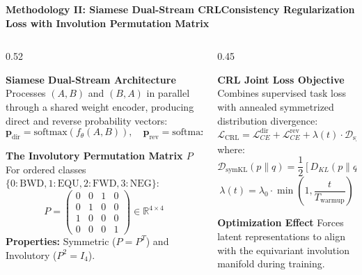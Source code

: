 \documentclass[aspectratio=169,10pt]{beamer}
\begin{document}
\begin{frame}{\textbf{Methodology II: Siamese Dual-Stream CRL}}{\textbf{Consistency Regularization Loss with Involution Permutation Matrix}}
  \begin{columns}[T]
    \begin{column}{0.52\textwidth}
      \begin{block}{\textbf{Siamese Dual-Stream Architecture}}
        \small
        Processes $(A, B)$ and $(B, A)$ in parallel through a shared weight encoder, producing direct and reverse probability vectors:
        $$\mathbf{p}_{\text{dir}} = \text{softmax}(f_\theta(A, B)), \quad \mathbf{p}_{\text{rev}} = \text{softmax}(f_\theta(B, A))$$
      \end{block}
      \vspace{0.1cm}
      \begin{block}{\textbf{The Involutory Permutation Matrix $P$}}
        \small
        For ordered classes $\{0:\text{BWD}, 1:\text{EQU}, 2:\text{FWD}, 3:\text{NEG}\}$:
        $$P = \begin{pmatrix} 0 & 0 & 1 & 0 \\ 0 & 1 & 0 & 0 \\ 1 & 0 & 0 & 0 \\ 0 & 0 & 0 & 1 \end{pmatrix} \in \mathbb{R}^{4 \times 4}$$
        \textbf{Properties:} Symmetric ($P = P^T$) and Involutory ($P^2 = I_4$).
      \end{block}
    \end{column}

    \begin{column}{0.45\textwidth}
      \begin{block}{\textbf{CRL Joint Loss Objective}}
        \small
        Combines supervised task loss with annealed symmetrized distribution divergence:
        $$\mathcal{L}_{\text{CRL}} = \mathcal{L}_{CE}^{\text{dir}} + \mathcal{L}_{CE}^{\text{rev}} + \lambda(t) \cdot \mathcal{D}_{\text{symKL}}\left(\mathbf{p}_{\text{dir}} \parallel \mathbf{p}_{\text{rev}} P\right)$$
        where:
        $$\mathcal{D}_{\text{symKL}}(p \parallel q) = \frac{1}{2}\left[D_{KL}(p \parallel q) + D_{KL}(q \parallel p)\right]$$
        $$\lambda(t) = \lambda_0 \cdot \min\left(1, \frac{t}{T_{\text{warmup}}}\right)$$
      \end{block}
      \vspace{0.1cm}
      \begin{exampleblock}{\textbf{Optimization Effect}}
        \footnotesize
        Forces latent representations to align with the equivariant involution manifold during training.
      \end{exampleblock}
    \end{column}
  \end{columns}
\end{frame}
\end{document}
